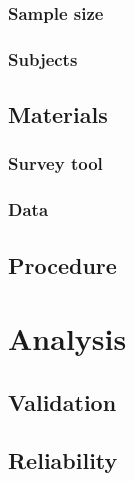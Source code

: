 \subsubsection{Sample size}

\subsubsection{Subjects}

\subsection{Materials}
\subsubsection{Survey tool}
\subsubsection{Data}

\subsection{Procedure}

\section{Analysis}
\label{sec:survey-analysis}

\subsection{Validation}
\subsection{Reliability}


